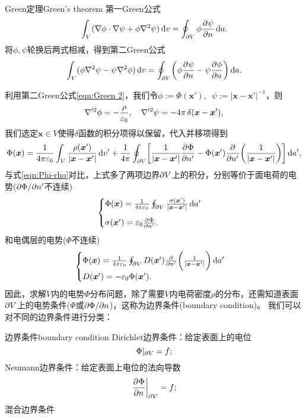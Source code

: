 \begin{theorem}{Green定理}{Green's theorem}
    第一Green公式
    \begin{equation}
        \label{eqn:Green 1}
        \int_V(\nabla\phi\cdot\nabla\psi+\phi\nabla^2\psi)\mathop{}\!\mathrm{d} v=\oint_{\partial V}\phi\frac{\partial^{{}}\psi}{\partial{n}^{{}}}\mathop{}\!\mathrm{d} a.
    \end{equation}
    将$\phi,\psi$轮换后两式相减，得到第二Green公式
    \begin{equation}
        \label{eqn:Green 2}
        \int_V(\phi\nabla^2\psi-\psi\nabla^2\phi)\mathop{}\!\mathrm{d} v=\oint_{\partial V}\biggl(\phi\frac{\partial^{{}}\psi}{\partial{n}^{{}}}-\psi\frac{\partial^{{}}\phi}{\partial{n}^{{}}}\biggr)\mathop{}\!\mathrm{d} a.
    \end{equation}
\end{theorem}

利用第二Green公式\eqref{eqn:Green 2}，我们令$\phi:=\Phi(\bm x'),\enspace\psi:=|\bm x-\bm x'|^{-1}$，则
\[
    \nabla'^2\phi=-\frac{\rho}{\varepsilon_0},\quad\nabla'^2\psi=-4\pi\mathop{}\!\delta(\bm x-\bm x'),
\]
我们选定$\bm x\in V$使得$\delta$函数的积分项得以保留，代入并移项得到
\begin{equation}
    \label{eqn:Phi-rho with boundary}
        \Phi(\bm x)=\frac1{4\pi\varepsilon_0}\int_V\frac{\rho(\bm x')}{|\bm x-\bm x'|}\mathop{}\!\mathrm{d} v'+\frac1{4\pi}\oint_{\partial V}\biggl[\frac1{|\bm x-\bm x'|}\frac{\partial^{{}}\Phi}{\partial{n'}^{{}}}-\Phi(\bm x')\frac{\partial^{{}}}{\partial{n'}^{{}}}\biggl(\frac1{|\bm x-\bm x'|}\biggr)\biggr]\mathop{}\!\mathrm{d} a',
\end{equation}
与式\eqref{eqn:Phi-rho}对比，上式多了两项边界$\partial V$上的积分，分别等价于面电荷的电势($\partial\Phi/\partial n'$不连续)
\[
    \begin{cases}
        \Phi(\bm x)=\frac1{4\pi\varepsilon_0}\oint_{\partial V}\frac{\sigma(\bm x')}{|\bm x-\bm x'|}\mathop{}\!\mathrm{d} a'\\[2ex]
        \sigma(\bm x')=\varepsilon_0\frac{\partial^{{}}\Phi}{\partial{n'}^{{}}}.
    \end{cases}
\]
和电偶层的电势($\Phi$不连续)
\[
    \begin{cases}
        \Phi(\bm x)=\frac1{4\pi\varepsilon_0}\oint_{\partial V}D(\bm x')\frac{\partial^{{}}}{\partial{n'}^{{}}}\biggl(\frac1{|\bm x-\bm x'|}\biggr)\mathop{}\!\mathrm{d} a'\\
        D(\bm x')=-\varepsilon_0\Phi(\bm x').
    \end{cases}
\]
因此，求解$V$内的电势$\Phi$分布问题，除了需要$V$内电荷密度$\rho$的分布，还需知道表面$\partial V$上的电势条件($\Phi$或$\partial\Phi/\partial n$)，这称为边界条件(boundary condition)。
我们可以对不同的边界条件进行分类：
\begin{definition}{边界条件}{boundary condition}
    Dirichlet边界条件：给定表面上的电位
    \[
        \Phi|_{\partial V}=f;
    \]
    Neumann边界条件：给定表面上电位的法向导数
    \[
        \left.\frac{\partial^{{}}\Phi}{\partial{n}^{{}}}\right\rvert_{\partial V}=f;
    \]
    混合边界条件
\end{definition}


